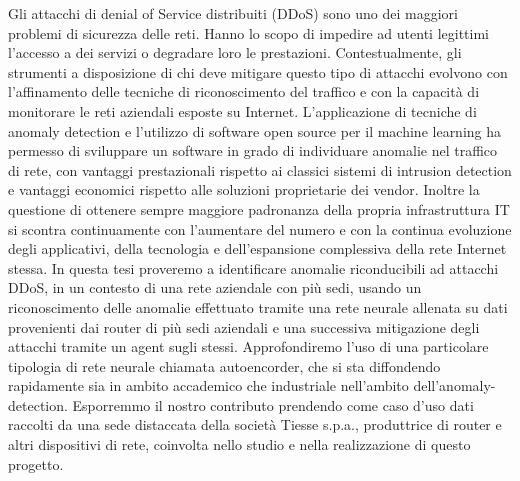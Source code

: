 


\italiano
\sommario
Gli attacchi di denial of Service distribuiti (DDoS) sono uno dei maggiori problemi di sicurezza delle reti. Hanno lo scopo di impedire ad utenti legittimi l'accesso a dei servizi o degradare loro le prestazioni. Contestualmente, gli strumenti a disposizione di chi deve mitigare questo tipo di attacchi evolvono con l'affinamento delle tecniche di riconoscimento del traffico e con la capacità di monitorare le reti aziendali esposte su Internet. L'applicazione di tecniche di anomaly detection e l'utilizzo di software open source per il machine learning ha permesso di sviluppare un software in grado di individuare anomalie nel traffico di rete, con vantaggi prestazionali rispetto ai classici sistemi di intrusion detection e vantaggi economici rispetto alle soluzioni proprietarie dei vendor. Inoltre la questione di ottenere sempre maggiore padronanza della propria infrastruttura IT si scontra continuamente con l'aumentare del numero e con la continua evoluzione degli applicativi, della tecnologia e dell'espansione complessiva della rete Internet stessa. In questa tesi proveremo a identificare anomalie riconducibili ad attacchi DDoS, in un contesto di una rete aziendale con più sedi, usando un riconoscimento delle anomalie effettuato tramite  una rete neurale allenata su dati provenienti dai router di più sedi aziendali e una successiva mitigazione degli attacchi tramite un agent sugli stessi. Approfondiremo l'uso di una particolare tipologia di rete neurale chiamata autoencorder, che si sta diffondendo rapidamente sia in ambito accademico che industriale nell'ambito dell'anomaly-detection. Esporremmo il nostro contributo prendendo come caso d'uso dati raccolti da una sede distaccata della società Tiesse s.p.a., produttrice di router e altri dispositivi di rete, coinvolta nello studio e nella realizzazione di questo progetto.

